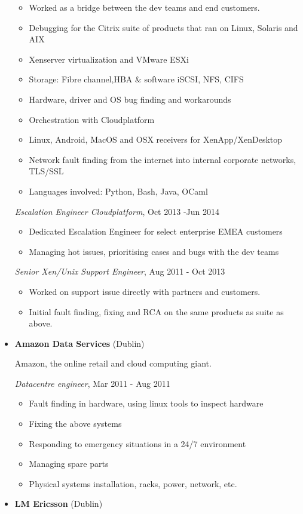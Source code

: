\documentclass[]{article}
\providecommand{\tightlist}{%
  \setlength{\itemsep}{0pt}\setlength{\parskip}{0pt}}
\begin{document}
\begin{itemize}
  \begin{itemize}
  \tightlist
  \item
    Worked as a bridge between the dev teams and end customers.
  \item
    Debugging for the Citrix suite of products that ran on Linux,
    Solaris and AIX
  \item
    Xenserver virtualization and VMware ESXi
  \item
    Storage: Fibre channel,HBA \& software iSCSI, NFS, CIFS
  \item
    Hardware, driver and OS bug finding and workarounds
  \item
    Orchestration with Cloudplatform
  \item
    Linux, Android, MacOS and OSX receivers for XenApp/XenDesktop
  \item
    Network fault finding from the internet into internal corporate
    networks, TLS/SSL
  \item
    Languages involved: Python, Bash, Java, OCaml
  \end{itemize}

  \emph{Escalation Engineer Cloudplatform}, Oct 2013 -Jun 2014

  \begin{itemize}
  \tightlist
  \item
    Dedicated Escalation Engineer for select enterprise EMEA customers
  \item
    Managing hot issues, prioritising cases and bugs with the dev teams
  \end{itemize}

  \emph{Senior Xen/Unix Support Engineer}, Aug 2011 - Oct 2013

  \begin{itemize}
  \tightlist
  \item
    Worked on support issue directly with partners and customers.
  \item
    Initial fault finding, fixing and RCA on the same products as suite
    as above.
  \end{itemize}
\item
  \textbf{Amazon Data Services} (Dublin)

  Amazon, the online retail and cloud computing giant.

  \emph{Datacentre engineer}, Mar 2011 - Aug 2011

  \begin{itemize}
  \tightlist
  \item
    Fault finding in hardware, using linux tools to inspect hardware
  \item
    Fixing the above systems
  \item
    Responding to emergency situations in a 24/7 environment
  \item
    Managing spare parts
  \item
    Physical systems installation, racks, power, network, etc.
  \end{itemize}
\item
  \textbf{LM Ericsson} (Dublin)


\end{itemize}
\end{document}

